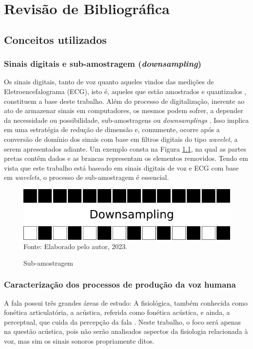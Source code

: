 \chapter{Revisão de Bibliográfica}
	\section{Conceitos utilizados}
	\label{ch:revisao}
		\subsection{Sinais digitais e sub-amostragem (\textit{downsampling})}
			\par Os sinais digitais, tanto de voz quanto aqueles vindos das medições de Eletroencefalograma (ECG), isto é, aqueles que estão amostrados e quantizados \cite{haykin2011sistemas}, constituem a base deste trabalho. Além do processo de digitalização, inerente ao ato de armazenar sinais em computadores, os mesmos podem sofrer, a depender da necessidade ou possibilidade, sub-amostragens ou \textit{downsamplings} \cite{robi2003}. Isso implica em uma estratégia de redução de dimensão e, comumente, ocorre após a conversão de domínio dos sinais com base em filtros digitais do tipo \textit{wavelet}, a serem apresentados adiante. Um exemplo consta na Figura \ref{fig:downsampling}, na qual as partes pretas contêm dados e as brancas representam os elementos removidos. Tendo em vista que este trabalho está baseado em sinais digitais de voz e ECG com base em \textit{wavelets}, o processo de sub-amostragem é essencial. 
			\begin{figure}[h]
				\centering
				\caption{Sub-amostragem}
				\includegraphics[width=0.4\linewidth]{images/downsampling}
				\label{fig:downsampling}
				\\Fonte: Elaborado pelo autor, 2023.
			\end{figure}
	
		\subsection{Caracterização dos processos de produção da voz humana}
			\par A fala possui três grandes áreas de estudo: A fisiológica, também conhecida como fonética articulatória, a acústica, referida como fonética acústica, e ainda, a perceptual, que cuida da percepção  da  fala \cite{kremer2014eficiencia}. Neste trabalho, o foco será apenas na questão acústica, pois não serão analisados aspectos da fisiologia relacionada à voz, mas sim os sinais sonoros propriamente ditos.
		
